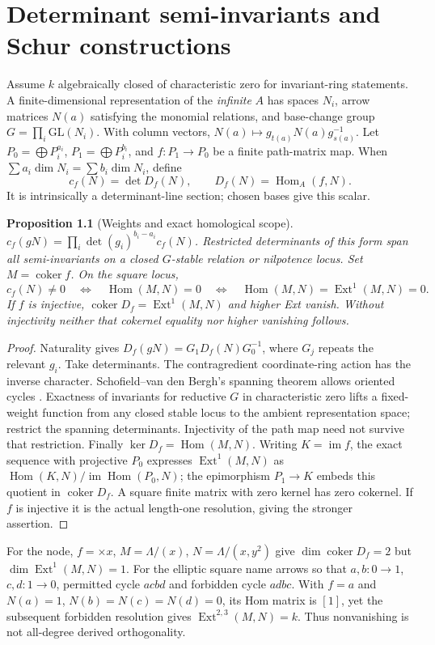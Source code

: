 \documentclass[11pt,oneside,openany]{book}
\newtheorem{proposition}[theorem]{Proposition}
\theoremstyle{definition}\newtheorem{definition}[theorem]{Definition}
\theoremstyle{remark}\newtheorem{remark}[theorem]{Remark}
\begin{document}
\chapter{Determinant semi-invariants and Schur constructions}
Assume $k$ algebraically closed of characteristic zero for invariant-ring statements. A finite-dimensional representation of the \emph{infinite} $A$ has spaces $N_i$, arrow matrices $N(a)$ satisfying the monomial relations, and base-change group $G=\prod_i\mathrm{GL}(N_i)$. With column vectors, $N(a)\mapsto g_{t(a)}N(a)g_{s(a)}^{-1}$. Let $P_0=\bigoplus P_i^{a_i}$, $P_1=\bigoplus P_i^{b_i}$, and $f:P_1\to P_0$ be a finite path-matrix map. When $\sum a_i\dim N_i=\sum b_i\dim N_i$, define
\[
 c_f(N)=\det D_f(N),\qquad D_f(N)=\operatorname{Hom}_A(f,N).
\]
It is intrinsically a determinant-line section; chosen bases give this scalar.
\begin{proposition}[Weights and exact homological scope]\label{thm:semi}
$c_f(gN)=\prod_i\det(g_i)^{b_i-a_i}c_f(N)$. Restricted determinants of this form span all semi-invariants on a closed $G$-stable relation or nilpotence locus. Set $M=\operatorname{coker}f$. On the square locus,
\[
 c_f(N)\ne0\quad\Longleftrightarrow\quad\operatorname{Hom}(M,N)=0
 \quad\Longleftrightarrow\quad\operatorname{Hom}(M,N)=\operatorname{Ext}^1(M,N)=0.
\]
If $f$ is injective, $\operatorname{coker}D_f=\operatorname{Ext}^1(M,N)$ and higher Ext vanish. Without injectivity neither that cokernel equality nor higher vanishing follows.
\end{proposition}
\begin{proof}
Naturality gives $D_f(gN)=G_1D_f(N)G_0^{-1}$, where $G_j$ repeats the relevant $g_i$. Take determinants. The contragredient coordinate-ring action has the inverse character. Schofield--van den Bergh's spanning theorem allows oriented cycles \cite[Theorem2.3]{SchofieldVdB}. Exactness of invariants for reductive $G$ in characteristic zero lifts a fixed-weight function from any closed stable locus to the ambient representation space; restrict the spanning determinants. Injectivity of the path map need not survive that restriction. Finally $\ker D_f=\operatorname{Hom}(M,N)$. Writing $K=\operatorname{im}f$, the exact sequence with projective $P_0$ expresses $\operatorname{Ext}^1(M,N)$ as $\operatorname{Hom}(K,N)/\operatorname{im}\operatorname{Hom}(P_0,N)$; the epimorphism $P_1\to K$ embeds this quotient in $\operatorname{coker}D_f$. A square finite matrix with zero kernel has zero cokernel. If $f$ is injective it is the actual length-one resolution, giving the stronger assertion.
\end{proof}
For the node, $f=\times x$, $M=\Lambda/(x)$, $N=\Lambda/(x,y^2)$ give $\dim\operatorname{coker}D_f=2$ but $\dim\operatorname{Ext}^1(M,N)=1$. For the elliptic square name arrows so that $a,b:0\to1$, $c,d:1\to0$, permitted cycle $acbd$ and forbidden cycle $adbc$. With $f=a$ and $N(a)=1$, $N(b)=N(c)=N(d)=0$, its Hom matrix is $[1]$, yet the subsequent forbidden resolution gives $\operatorname{Ext}^{2,3}(M,N)=k$. Thus nonvanishing is not all-degree derived orthogonality.
\end{document}
